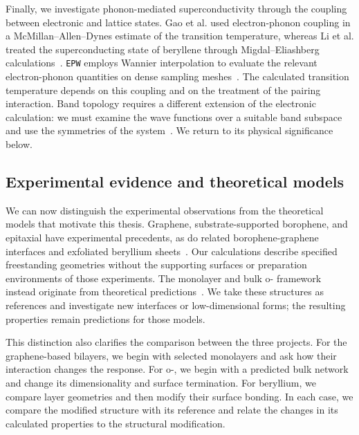 Finally, we investigate phonon-mediated superconductivity through the coupling between electronic and lattice states.
Gao et al. used electron-phonon coupling in a McMillan--Allen--Dynes estimate of the transition temperature, whereas Li et al. treated the superconducting state of beryllene through Migdal--Eliashberg calculations~\cite{gao2017prediction,li2023coexistence}.
\texttt{EPW} employs Wannier interpolation to evaluate the relevant electron-phonon quantities on dense sampling meshes~\cite{ponce2016epw}.
The calculated transition temperature depends on this coupling and on the treatment of the pairing interaction.
Band topology requires a different extension of the electronic calculation: we must examine the wave functions over a suitable band subspace and use the symmetries of the system~\cite{fu2007topological}.
We return to its physical significance below.

\subsection{Experimental evidence and theoretical models}
\label{subsec:lit_critical_status}

We can now distinguish the experimental observations from the theoretical models that motivate this thesis.
Graphene, substrate-supported borophene, and epitaxial  have experimental precedents, as do related borophene-graphene interfaces and exfoliated beryllium sheets~\cite{novoselov2004electric,mannix2015synthesis,feng2016experimental,tanaka2005novel,liu2019borophene,chahal2023beryllene}.
Our calculations describe specified freestanding geometries without the supporting surfaces or preparation environments of those experiments.
The  monolayer and bulk o- framework instead originate from theoretical predictions~\cite{tian2019,han2023superconducting}.
We take these structures as references and investigate new interfaces or low-dimensional forms; the resulting properties remain predictions for those models.

This distinction also clarifies the comparison between the three projects.
For the graphene-based bilayers, we begin with selected monolayers and ask how their interaction changes the response.
For o-, we begin with a predicted bulk network and change its dimensionality and surface termination.
For beryllium, we compare layer geometries and then modify their surface bonding.
In each case, we compare the modified structure with its reference and relate the changes in its calculated properties to the structural modification.

